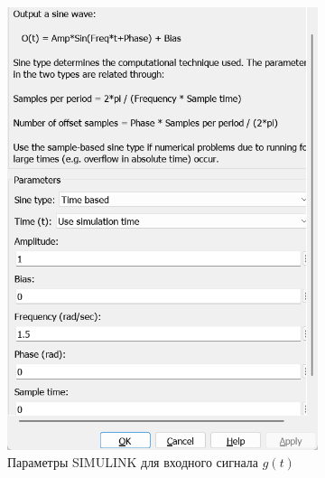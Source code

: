 \documentclass[a4paper, 12pt]{article}
\begin{document}
    \begin{figure}[H]
        \centering
        \begin{subfigure}{0.3\textwidth}
            \centering
            \includegraphics[width=\linewidth]{scheme3_window_sine.png}
            \caption{Параметры SIMULINK для входного сигнала $g(t)$}
            \label{fig:gt}
        \end{subfigure}
        \begin{subfigure}{0.3\textwidth}
            \centering

\end{subfigure}
\end{figure}
\end{document}
